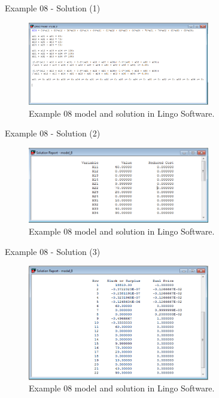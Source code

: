 \begin{frame}{Example 08 - Solution (1)}
\begin{figure}
    \includegraphics[width=300px]{slides/ex08/screenshot_a.png}
    \caption{Example 08 model and solution in Lingo Software.}
\end{figure}
\end{frame}

\begin{frame}{Example 08 - Solution (2)}
\begin{figure}
    \includegraphics[width=300px]{slides/ex08/screenshot_b.png}
    \caption{Example 08 model and solution in Lingo Software.}
\end{figure}
\end{frame}


\begin{frame}{Example 08 - Solution (3)}
\begin{figure}
    \includegraphics[width=300px]{slides/ex08/screenshot_c.png}
    \caption{Example 08 model and solution in Lingo Software.}
\end{figure}
\end{frame}

